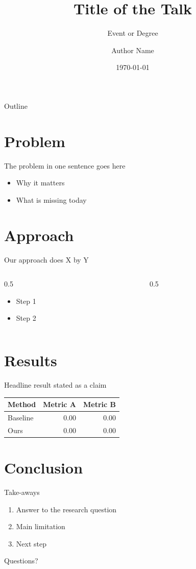 \documentclass[aspectratio=169,11pt]{beamer}
\title{\textbf{Title of the Talk}}
\subtitle{Event or Degree}
\author{Author Name}
\institute{Institution}
\date{\today}
\begin{document}
\begin{frame}
  \titlepage
\end{frame}

\begin{frame}{Outline}
  \tableofcontents
\end{frame}

\section{Problem}
\begin{frame}{The problem in one sentence goes here}
  \begin{itemize}
    \item Why it matters
    \item What is missing today
  \end{itemize}
\end{frame}

\section{Approach}
\begin{frame}{Our approach does X by Y}
  \begin{columns}
    \begin{column}{0.5\textwidth}
      \begin{itemize}
        \item Step 1
        \item Step 2
      \end{itemize}
    \end{column}
    \begin{column}{0.5\textwidth}
      \centering{}
    \end{column}
  \end{columns}
\end{frame}

\section{Results}
\begin{frame}{Headline result stated as a claim}
  \centering
  \begin{tabular}{lrr}
    \toprule
    Method & Metric A & Metric B \\
    \midrule
    Baseline & 0.00 & 0.00 \\
    Ours     & \alert{0.00} & \alert{0.00} \\
    \bottomrule
  \end{tabular}
\end{frame}

\section{Conclusion}
\begin{frame}{Take-aways}
  \begin{enumerate}
    \item Answer to the research question
    \item Main limitation
    \item Next step
  \end{enumerate}
\end{frame}

\begin{frame}
  \centering\Large Questions?
\end{frame}
\end{document}
